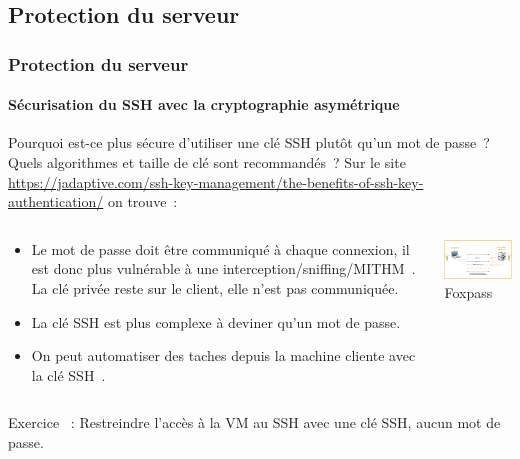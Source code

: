 \documentclass{beamer}
\begin{document}
    \subsection{Protection du serveur}\label{subsec:protection-serveur}
    \begin{frame}
        \frametitle{Protection du serveur}
        \framesubtitle{Sécurisation du SSH avec la cryptographie asymétrique}
        \transdissolve
        \begin{footnotesize}
            Pourquoi est-ce plus sécure d'utiliser une clé SSH plutôt qu'un mot de passe~?
            \bigbreak
            Quels algorithmes et taille de clé sont recommandés~?
            \pause
            \bigbreak
            Sur le site \url{https://jadaptive.com/ssh-key-management/the-benefits-of-ssh-key-authentication/} on trouve~:
            \begin{columns}
                \begin{column}{0.6\textwidth}
                    \begin{itemize}
                        \item Le mot de passe doit être communiqué à chaque connexion, il est donc plus vulnérable à une interception/sniffing/MITHM~.
                        La clé privée reste sur le client, elle n'est pas communiquée.
                        \item La clé SSH est plus complexe à deviner qu'un mot de passe.
                        \item On peut automatiser des taches depuis la machine cliente avec la clé SSH~.
                    \end{itemize}
                \end{column}
                \begin{column}{0.4\textwidth}
                    \centering
                    \includegraphics[width=5cm]{image/ssh-key-diagram} \\ Foxpass\footnotemark \\
                \end{column}
            \end{columns}
            \flushleft
            Exercice \execcounterdispinc{}~:
            Restreindre l'accès à la VM au SSH avec une clé SSH, aucun mot de passe.
        \end{footnotesize}
    \end{frame}
\end{document}
